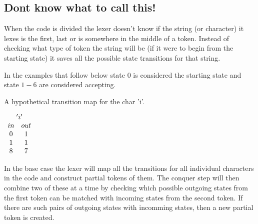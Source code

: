 \subsection{Dont know what to call this!}
When the code is divided the lexer doesn't know if the string (or character) it
lexes is the first, last or is somewhere in the middle of a token. Instead of
checking what type of token the string will be (if it were to begin from the
starting state) it saves all the possible state transitions for that string.

In the examples that follow below state 0 is considered the starting state and
state $1-6$ are considered accepting.
\begin{example}\label{transMap}
A hypothetical transition map for the char 'i'.
\begin{center}$\begin{array}{cc}
\multicolumn{2}{c}{'i'}\\
in & out\\
0 & 1\\
1 & 1\\
8 & 7\\
\end{array}$\\
\end{center}
\end{example}
In the base case the lexer will map all the transitions for all individual
characters in the code and construct partial tokens of them. The conquer step
will then combine two of these at a time by checking which possible outgoing
states from the first token can be matched with incoming states from the second
token. If there are such pairs of outgoing states with incomming states, then a
new partial token is created.
